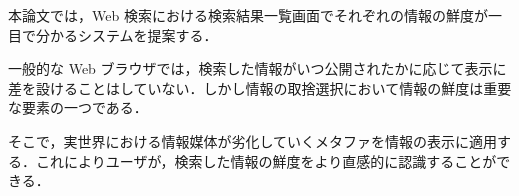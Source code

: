 


\begin{jabstract}

本論文では，Web 検索における検索結果一覧画面でそれぞれの情報の鮮度が一目で分かるシステムを提案する．

一般的な Web ブラウザでは，検索した情報がいつ公開されたかに応じて表示に差を設けることはしていない．しかし情報の取捨選択において情報の鮮度は重要な要素の一つである．

そこで，実世界における情報媒体が劣化していくメタファを情報の表示に適用する．これによりユーザが，検索した情報の鮮度をより直感的に認識することができる．

\end{jabstract}
